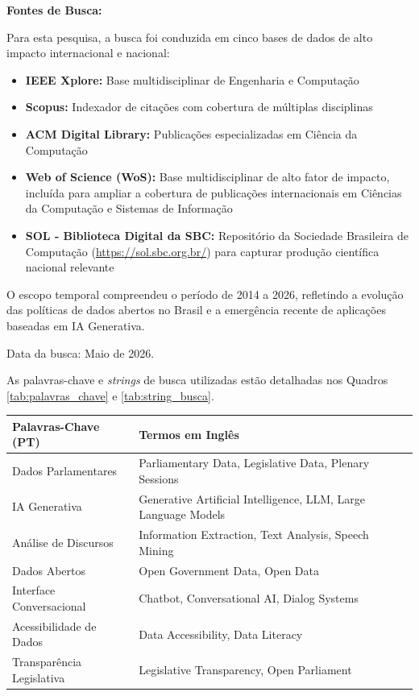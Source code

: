 \textbf{Fontes de Busca:}

Para esta pesquisa, a busca foi conduzida em cinco bases de dados de alto impacto internacional e nacional:

\begin{itemize}
    \item \textbf{IEEE Xplore:} Base multidisciplinar de Engenharia e Computação
    \item \textbf{Scopus:} Indexador de citações com cobertura de múltiplas disciplinas
    \item \textbf{ACM Digital Library:} Publicações especializadas em Ciência da Computação
    \item \textbf{Web of Science (WoS):} Base multidisciplinar de alto fator de impacto, incluída para ampliar a cobertura de publicações internacionais em Ciências da Computação e Sistemas de Informação
    \item \textbf{SOL - Biblioteca Digital da SBC:} Repositório da Sociedade Brasileira de Computação (\url{https://sol.sbc.org.br/}) para capturar produção científica nacional relevante
\end{itemize}

O escopo temporal compreendeu o período de 2014 a 2026, refletindo a evolução das políticas de dados abertos no Brasil e a emergência recente de aplicações baseadas em IA Generativa.

Data da busca: Maio de 2026.

As palavras-chave e \textit{strings} de busca utilizadas estão detalhadas nos Quadros \ref{tab:palavras_chave} e \ref{tab:string_busca}.

\begin{quadro}[H]
    \centering
    \caption{Palavras-Chave da Busca}
    \label{tab:palavras_chave}
    \begin{tabular}{p{5cm}p{8cm}}
    \toprule
    \textbf{Palavras-Chave (PT)} & \textbf{Termos em Inglês} \\
    \midrule
    Dados Parlamentares & Parliamentary Data, Legislative Data, Plenary Sessions \\
    IA Generativa & Generative Artificial Intelligence, LLM, Large Language Models \\
    Análise de Discursos & Information Extraction, Text Analysis, Speech Mining \\
    Dados Abertos & Open Government Data, Open Data \\
    Interface Conversacional & Chatbot, Conversational AI, Dialog Systems \\
    Acessibilidade de Dados & Data Accessibility, Data Literacy \\
    Transparência Legislativa & Legislative Transparency, Open Parliament \\
    \bottomrule
    \end{tabular}
\end{quadro}

